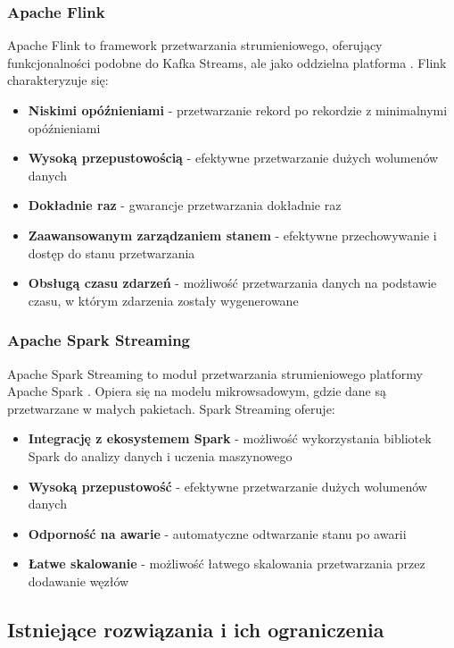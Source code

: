 \subsubsection{Apache Flink}
\label{subsubsec:apache_flink}

Apache Flink to framework przetwarzania strumieniowego, oferujący funkcjonalności podobne do Kafka Streams,
ale jako oddzielna platforma \citep{flink}. Flink charakteryzuje się:

\begin{itemize}
    \item \textbf{Niskimi opóźnieniami} - przetwarzanie rekord po rekordzie z minimalnymi opóźnieniami
    \item \textbf{Wysoką przepustowością} - efektywne przetwarzanie dużych wolumenów danych
    \item \textbf{Dokładnie raz} - gwarancje przetwarzania dokładnie raz
    \item \textbf{Zaawansowanym zarządzaniem stanem} - efektywne przechowywanie i dostęp do stanu przetwarzania
    \item \textbf{Obsługą czasu zdarzeń} - możliwość przetwarzania danych na podstawie czasu, w którym zdarzenia zostały wygenerowane
\end{itemize}

\subsubsection{Apache Spark Streaming}
\label{subsubsec:spark_streaming}

Apache Spark Streaming to moduł przetwarzania strumieniowego platformy Apache Spark \citep{spark_streaming}.
Opiera się na modelu mikrowsadowym, gdzie dane są przetwarzane w małych pakietach. Spark Streaming oferuje:

\begin{itemize}
    \item \textbf{Integrację z ekosystemem Spark} - możliwość wykorzystania bibliotek Spark do analizy danych i uczenia maszynowego
    \item \textbf{Wysoką przepustowość} - efektywne przetwarzanie dużych wolumenów danych
    \item \textbf{Odporność na awarie} - automatyczne odtwarzanie stanu po awarii
    \item \textbf{Łatwe skalowanie} - możliwość łatwego skalowania przetwarzania przez dodawanie węzłów
\end{itemize}

\subsection{Istniejące rozwiązania i ich ograniczenia}
\label{subsec:istniejace_rozwiazania}


